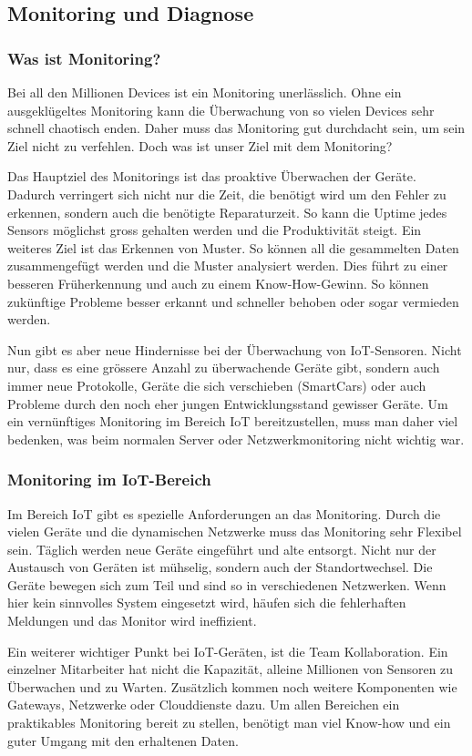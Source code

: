 \subsection{Monitoring und Diagnose}
\subsubsection{Was ist Monitoring?}
Bei all den Millionen Devices ist ein Monitoring unerlässlich. Ohne ein ausgeklügeltes Monitoring kann die Überwachung von so vielen Devices sehr schnell chaotisch enden. Daher muss das Monitoring gut durchdacht sein, um sein Ziel nicht zu verfehlen. Doch was ist unser Ziel mit dem Monitoring?

Das Hauptziel des Monitorings ist das proaktive Überwachen der Geräte. Dadurch verringert sich nicht nur die Zeit, die benötigt wird um den Fehler zu erkennen, sondern auch die benötigte Reparaturzeit. So kann die Uptime jedes Sensors möglichst gross gehalten werden und die Produktivität steigt. Ein weiteres Ziel ist das Erkennen von Muster. So können all die gesammelten Daten zusammengefügt werden und die Muster analysiert werden. Dies führt zu einer besseren Früherkennung und auch zu einem Know-How-Gewinn. So können zukünftige Probleme besser erkannt und schneller behoben oder sogar vermieden werden.\cite{MonZiele}

Nun gibt es aber neue Hindernisse bei der Überwachung von IoT-Sensoren. Nicht nur, dass es eine grössere Anzahl zu überwachende Geräte gibt, sondern auch immer neue Protokolle, Geräte die sich verschieben (SmartCars) oder auch Probleme durch den noch eher jungen Entwicklungsstand gewisser Geräte. Um ein vernünftiges Monitoring im Bereich IoT bereitzustellen, muss man daher viel bedenken, was beim normalen Server oder Netzwerkmonitoring nicht wichtig war.
\subsubsection{Monitoring im IoT-Bereich}
Im Bereich IoT gibt es spezielle Anforderungen an das Monitoring. Durch die vielen Geräte und die dynamischen Netzwerke muss das Monitoring sehr Flexibel sein. Täglich werden neue Geräte eingeführt und alte entsorgt. Nicht nur der Austausch von Geräten ist mühselig, sondern auch der Standortwechsel. Die Geräte bewegen sich zum Teil und sind so in verschiedenen Netzwerken. Wenn hier kein sinnvolles System eingesetzt wird, häufen sich die fehlerhaften Meldungen und das Monitor wird ineffizient.

Ein weiterer wichtiger Punkt bei IoT-Geräten, ist die Team Kollaboration. Ein einzelner Mitarbeiter hat nicht die Kapazität, alleine Millionen von Sensoren zu Überwachen und zu Warten. Zusätzlich kommen noch weitere Komponenten wie Gateways, Netzwerke oder Clouddienste dazu. Um allen Bereichen ein praktikables Monitoring bereit zu stellen, benötigt man viel Know-how und ein guter Umgang mit den erhaltenen Daten.


